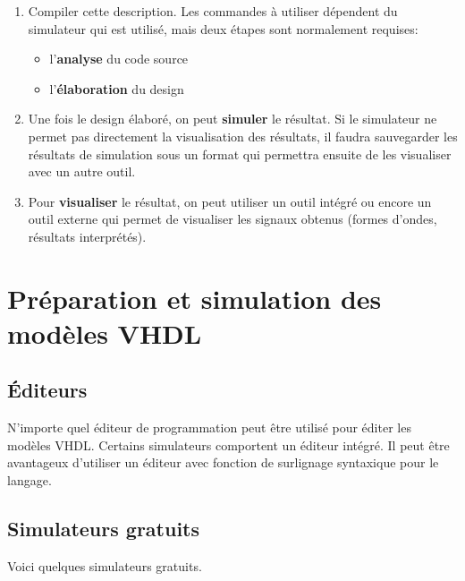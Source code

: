 \documentclass[letter, oneside]{book}
\begin{document}
\begin{enumerate}
\item Compiler cette description. Les commandes à utiliser dépendent du
simulateur qui est utilisé, mais deux étapes sont normalement
requises:
\begin{itemize}
\item l'\textbf{analyse} du code source
\item l'\textbf{élaboration} du design
\end{itemize}

\item Une fois le design élaboré, on peut \textbf{simuler} le résultat. Si le
simulateur ne permet pas directement la visualisation des
résultats, il faudra sauvegarder les résultats de simulation sous un
format qui permettra ensuite de les visualiser avec un autre outil.

\item Pour \textbf{visualiser} le résultat, on peut utiliser un outil intégré ou encore un
outil externe qui permet de visualiser les signaux obtenus (formes d'ondes,
résultats interprétés).
\end{enumerate}

\chapter{Préparation et simulation des modèles VHDL}
\label{sec:org516b9d1}

\section{Éditeurs}
\label{sec:orga3fd960}

N'importe quel éditeur de programmation peut être utilisé pour éditer
les modèles VHDL. Certains simulateurs comportent un éditeur
intégré. Il peut être avantageux d'utiliser un éditeur avec fonction
de surlignage syntaxique pour le langage.

\section{Simulateurs gratuits}
\label{sec:orgd262480}

Voici quelques simulateurs gratuits. 
\end{document}
